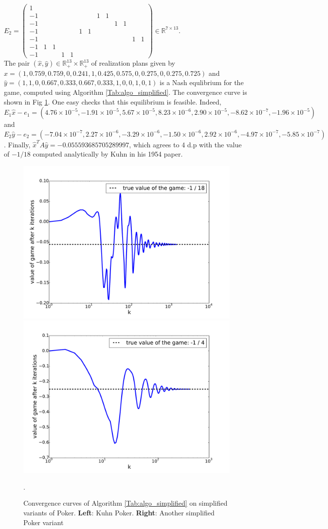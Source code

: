\documentclass[a4paper,9pt,journal]{IEEEtran}
\begin{document}
$E_2 = \left(\begin{array}{ccccccccccccc}
1 &   &   &   &   &   &   &   &   &   &   &   &  \\
-1 &   &   &   &   &   &   & 1 & 1 &   &   &   &  \\
-1 &   &   &   &   &   &   &   &   & 1 & 1 &   &  \\
-1 &   &   &   &   & 1 & 1 &   &   &   &   &   &  \\
-1 &   &   &   &   &   &   &   &   &   &   & 1 & 1\\
-1 & 1 & 1 &   &   &   &   &   &   &   &   &   &  \\
-1 &   &   & 1 & 1 &   &   &   &   &   &   &   &  
\end{array}\right)  \in \mathbb{R}^{7 \times 13}$.\\
The pair $(\hat{x}, \hat{y}) \in \mathbb{R}^{13}_+ \times \mathbb{R}^{13}_+$ of realization plans given by $\hat{x} = (1, 0.759, 0.759, 0, 0.241, 1, 0.425, 0.575, 0, 0.275, 0, 0.275, 0.725)$ and\\
$\hat{y} = (1, 1, 0, 0.667, 0.333, 0.667, 0.333, 1, 0, 0, 1, 0, 1)$ is a Nash equlibrium for the game, computed using Algorithm  \ref{Tab:algo_simplified}. The convergence curve is shown in Fig \ref{Tab:conv_curves}. One easy checks that this equilibrium is feasible. Indeed,  $E_1\hat{x} - e_1 = (4.76 \times 10^{-5}, -1.91 \times 10^{-5}, 5.67 \times 10^{-5}, 8.23 \times 10^{-6}, 2.90 \times 10^{-5}, -8.62 \times 10^{-7}, -1.96 \times 10^{-5})$ and $E_2\hat{y} - e_2 = (-7.04 \times 10^{-7}, 2.27 \times 10^{-6}, -3.29 \times 10^{-6}, -1.50 \times 10^{-6}, 2.92 \times 10^{-6}, -4.97 \times 10^{-7}, -5.85 \times 10^{-7})$. Finally, $\hat{x}^TA\hat{y} = -0.055593685705289997$, which agrees to 4 d.p with the value of $-1 / 18$ computed analytically by Kuhn in his 1954 paper.

\begin{figure}
  \includegraphics[width=.5\linewidth]{Kuhn3112_NE.pdf}
  \includegraphics[width=.5\linewidth]{SimplifiedPoker_NE.pdf}
  \caption{Convergence curves of Algorithm \ref{Tab:algo_simplified} on simplified variants of Poker. \textbf{Left}: Kuhn Poker. \textbf{Right}: Another simplified Poker variant}.
  \label{Tab:conv_curves}
\end{figure}
\end{document}
